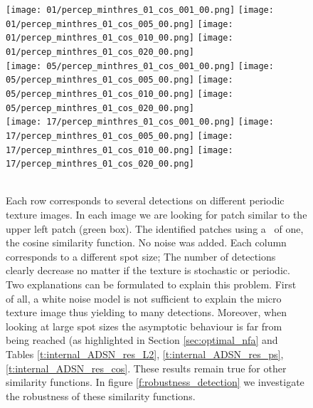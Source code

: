 \begin{figure}[H]
  \centering
  {\texttt{[image: 01/percep\_minthres\_01\_cos\_001\_00.png]}} \hfill
  {\texttt{[image: 01/percep\_minthres\_01\_cos\_005\_00.png]}} \hfill
  {\texttt{[image: 01/percep\_minthres\_01\_cos\_010\_00.png]}} \hfill  
  {\texttt{[image: 01/percep\_minthres\_01\_cos\_020\_00.png]}} \hfill \\
  {\texttt{[image: 05/percep\_minthres\_01\_cos\_001\_00.png]}} \hfill
  {\texttt{[image: 05/percep\_minthres\_01\_cos\_005\_00.png]}} \hfill
  {\texttt{[image: 05/percep\_minthres\_01\_cos\_010\_00.png]}} \hfill  
  {\texttt{[image: 05/percep\_minthres\_01\_cos\_020\_00.png]}} \hfill \\
  {\texttt{[image: 17/percep\_minthres\_01\_cos\_001\_00.png]}} \hfill
  {\texttt{[image: 17/percep\_minthres\_01\_cos\_005\_00.png]}} \hfill
  {\texttt{[image: 17/percep\_minthres\_01\_cos\_010\_00.png]}} \hfill  
  {\texttt{[image: 17/percep\_minthres\_01\_cos\_020\_00.png]}} \hfill \\
   \hfill
   \hfill
   \hfill  
   \hfill \\
  \caption{Each row corresponds to several detections on different periodic texture images. In each image we are looking for patch similar to the upper left patch (green box). The identified patches using a \NFA \ of one, the cosine similarity function. No noise was added. Each column corresponds to a different spot size; The number of detections clearly decrease no matter if the texture is stochastic or periodic. Two explanations can be formulated to explain this problem. First of all, a white noise model is not sufficient to explain the micro texture image thus yielding to many detections. Moreover, when looking at large spot sizes the asymptotic behaviour is far from being reached (as highlighted in Section \ref{sec:optimal_nfa} and Tables \ref{t:internal_ADSN_res_L2}, \ref{t:internal_ADSN_res_ps}, \ref{t:internal_ADSN_res_cos}. These results remain true for other similarity functions. In figure \ref{f:robustness_detection} we investigate the robustness of these similarity functions.}
  \label{f:model_size}
\end{figure}


